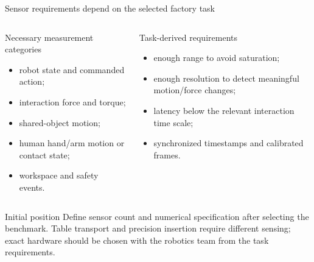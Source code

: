 \documentclass[aspectratio=169,11pt]{beamer}
\begin{document}
\begin{frame}{Sensor requirements depend on the selected factory task}
\begin{columns}[T,onlytextwidth]
\begin{block}{Necessary measurement categories}
\begin{itemize}
  \item robot state and commanded action;
  \item interaction force and torque;
  \item shared-object motion;
  \item human hand/arm motion or contact state;
  \item workspace and safety events.
\end{itemize}
\end{block}
\begin{block}{Task-derived requirements}
\begin{itemize}
  \item enough range to avoid saturation;
  \item enough resolution to detect meaningful motion/force changes;
  \item latency below the relevant interaction time scale;
  \item synchronized timestamps and calibrated frames.
\end{itemize}
\end{block}
\end{columns}
\begin{alertblock}{Initial position}
Define sensor count and numerical specification after selecting the benchmark. Table transport and precision insertion require different sensing; exact hardware should be chosen with the robotics team from the task requirements.
\end{alertblock}
\end{frame}
\end{document}
